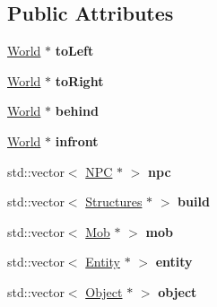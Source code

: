 \subsection*{Public Attributes}
\begin{DoxyCompactItemize}
\item 
\hypertarget{classWorld_aaa256245e0bc49ec2fa55f5d48e1959f}{}\hyperlink{classWorld}{World} $\ast$ {\bfseries to\+Left}\label{classWorld_aaa256245e0bc49ec2fa55f5d48e1959f}

\item 
\hypertarget{classWorld_aa40d02c50a3eedb2f329077f3d6d44e6}{}\hyperlink{classWorld}{World} $\ast$ {\bfseries to\+Right}\label{classWorld_aa40d02c50a3eedb2f329077f3d6d44e6}

\item 
\hypertarget{classWorld_af9aed08dfdf0d280f3e13a21a0090f2c}{}\hyperlink{classWorld}{World} $\ast$ {\bfseries behind}\label{classWorld_af9aed08dfdf0d280f3e13a21a0090f2c}

\item 
\hypertarget{classWorld_a1c1ad92a3d0296c5796a8544537ece13}{}\hyperlink{classWorld}{World} $\ast$ {\bfseries infront}\label{classWorld_a1c1ad92a3d0296c5796a8544537ece13}

\item 
\hypertarget{classWorld_a844d733d29d8367c3896bff7a1fad82d}{}std\+::vector$<$ \hyperlink{classNPC}{N\+P\+C} $\ast$ $>$ {\bfseries npc}\label{classWorld_a844d733d29d8367c3896bff7a1fad82d}

\item 
\hypertarget{classWorld_ab5120be97f20e7ee24e056127ff3164c}{}std\+::vector$<$ \hyperlink{classStructures}{Structures} $\ast$ $>$ {\bfseries build}\label{classWorld_ab5120be97f20e7ee24e056127ff3164c}

\item 
\hypertarget{classWorld_ab45f9d6909b887f01c76bfe6120ccdd9}{}std\+::vector$<$ \hyperlink{classMob}{Mob} $\ast$ $>$ {\bfseries mob}\label{classWorld_ab45f9d6909b887f01c76bfe6120ccdd9}

\item 
\hypertarget{classWorld_afb74ee60415875384d8af0e065d9feb3}{}std\+::vector$<$ \hyperlink{classEntity}{Entity} $\ast$ $>$ {\bfseries entity}\label{classWorld_afb74ee60415875384d8af0e065d9feb3}

\item 
\hypertarget{classWorld_a3ec7a136f45a7283a0a15224819fe330}{}std\+::vector$<$ \hyperlink{classObject}{Object} $\ast$ $>$ {\bfseries object}\label{classWorld_a3ec7a136f45a7283a0a15224819fe330}

\end{DoxyCompactItemize}

